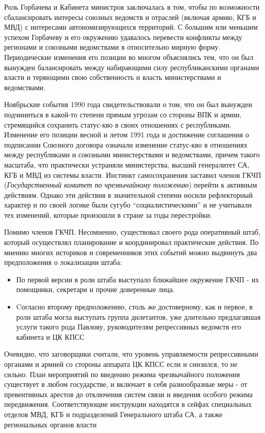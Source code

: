 \documentclass[12pt]{extarticle}
\begin{document}
Роль Горбачева и Кабинета министров заключалась в том, чтобы по возможности сбалансировать интересы союзных ведомств и отраслей (включая армию, КГБ и МВД) с интересами автономизирующихся территорий. С большим или меньшим успехом Горбачеву и его окружению удавалось перевести конфликты между регионами и союзными ведомствами в относительно мирную форму. Периодические изменения его позиции во многом объяснялись тем, что он был вынужден балансировать между набирающими силу республиканскими органами власти и теряющими свою собственность и власть министерствами и ведомствами.

Ноябрьские события 1990 года свидетельствовали о том, что он был вынужден подчиниться в какой-то степени прямым угрозам со стороны ВПК и армии, стремящийся сохранить статус-кво в своих отношениях с республиками. Изменение его позиции весной и летом 1991 года и достижение соглашения о подписании Союзного договора означали изменение статус-кво в отношениях между республиками и союзными министерствами и ведомствами, причем такого масштаба, что практически устраняли министерства, высший генералитет СА, КГБ и МВД из системы власти. Инстинкт самосохранения заставил членов ГКЧП (\emph{Государственный комитет по чрезвычайному положению}) перейти к активным действиям. Однако эти действия в значительной степени носили рефлекторный характер и по своей логике были сугубо “социалистическими” и не учитывали тех изменений, которые произошли в стране за годы перестройки.

Помимо членов ГКЧП. Несомненно, существовал своего рода оперативный штаб, который осуществлял планирование и координировал практические действия. По мнению многих историков и современников этих событий можно выдвинуть два предположения о локализации штаба:
\begin{itemize}
	\item По первой версии в роли штаба выступало ближайшее окружение ГКЧП - их помощники, секретари и прочие доверенные лица.
	\item Cогласно второму предположению, столь же достоверному, как и первое, в роли штаба могла выступать группа дилетантов, уже длительно предлагавшая услуги такого рода Павлову, руководителям репрессивных ведомств его кабинета и ЦК КПСС \cite{1}
\end{itemize}

Очевидно, что заговорщики считали, что уровень управляемости репрессивными органами и армией со стороны аппарата ЦК КПСС если и снизился, то не сильно. План мероприятий по введению режима чрезвычайного положения существует в любом государстве, и включает в себя разнообразные меры - от превентивных арестов до отключения систем связи и введения особого режима передвижения. Соответствующие инструкции находятся в сейфах специальных отделов МВД, КГБ и подразделений Генерального штаба СА, а также региональных органов власти \cite{2}
\end{document}
